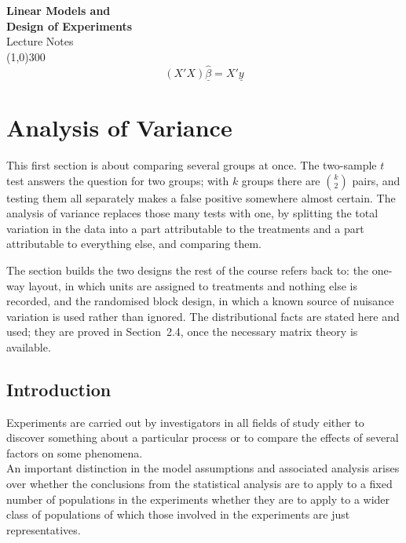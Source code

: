 \documentclass[11pt,a4paper]{article}
\theoremstyle{definition}
\begin{document}
\begin{titlepage}
\begin{center}
\vspace*{3cm}
{\Huge\bfseries Linear Models and\\[0.35cm] Design of Experiments}\\[1.2cm]
{\large Lecture Notes}\\[2.5cm]
\line(1,0){300}\\[1.5cm]
$$\left(X'X\right)\widehat{\underline{\beta}} = X'\underline{y}$$
\end{center}
\end{titlepage}


\tableofcontents
\thispagestyle{empty}
\clearpage
\setcounter{page}{1}


\pagebreak

\section{Analysis of Variance}
This first section is about comparing several groups at once. The two-sample
$t$ test answers the question for two groups; with $k$ groups there are
$\binom{k}{2}$ pairs, and testing them all separately makes a false positive
somewhere almost certain. The analysis of variance replaces those many tests
with one, by splitting the total variation in the data into a part attributable
to the treatments and a part attributable to everything else, and comparing
them.

The section builds the two designs the rest of the course refers back to: the
one-way layout, in which units are assigned to treatments and nothing else is
recorded, and the randomised block design, in which a known source of nuisance
variation is used rather than ignored. The distributional facts are stated here
and used; they are proved in Section~2.4, once the necessary matrix theory is
available.



\subsection{Introduction}
Experiments are carried out by investigators in all fields of study either to discover something about a particular process or to compare the effects of several factors on some phenomena.\\
An important distinction in the model assumptions and associated analysis arises over whether the conclusions from the statistical analysis are to apply to a  fixed number of populations in the experiments whether they are to apply to a wider class of populations of which those involved in the experiments are just representatives.
\end{document}
